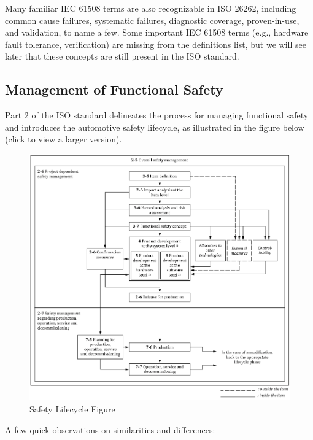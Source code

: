 \documentclass[./dissertation.tex]{subfiles}
\begin{document}
Many familiar IEC 61508 terms are also recognizable in ISO 26262, including common cause failures, systematic failures, diagnostic coverage, proven-in-use, and validation, to name a few. Some important IEC 61508 terms (e.g., hardware fault tolerance, verification) are missing from the definitions list, but we will see later that these concepts are still present in the ISO standard.


\subsection{Management of Functional Safety}
Part 2 of the ISO standard delineates the process for managing functional safety and introduces the automotive safety lifecycle, as illustrated in the figure below (click to view a larger version).

\begin{figure}[h]
\centering
\includegraphics[scale=0.5]{subfiles/imgs/SafetyLifecycleFigure.png}
\caption{Safety Lifecycle Figure}
\label{fig:safety_lifecycle}
\end{figure}


A few quick observations on similarities and differences:
\end{document}
